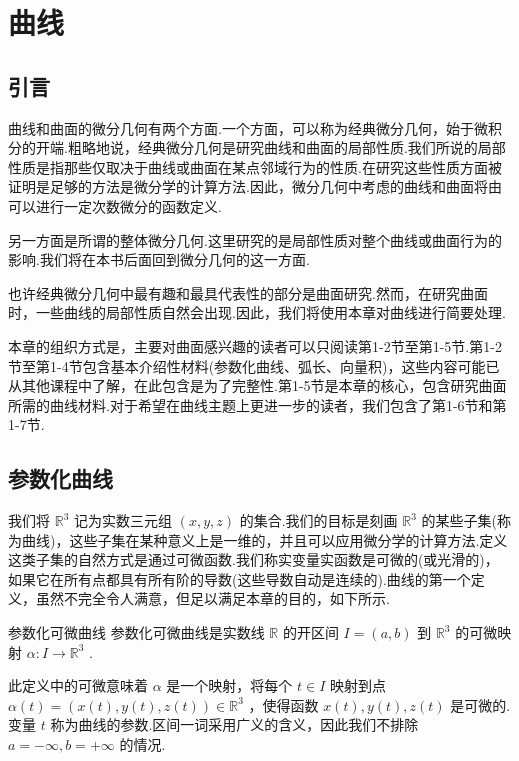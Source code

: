 \chapter{曲线}

\section{引言}

曲线和曲面的微分几何有两个方面.一个方面，可以称为经典微分几何，始于微积分的开端.粗略地说，经典微分几何是研究曲线和曲面的局部性质.我们所说的局部性质是指那些仅取决于曲线或曲面在某点邻域行为的性质.在研究这些性质方面被证明是足够的方法是微分学的计算方法.因此，微分几何中考虑的曲线和曲面将由可以进行一定次数微分的函数定义.

另一方面是所谓的整体微分几何.这里研究的是局部性质对整个曲线或曲面行为的影响.我们将在本书后面回到微分几何的这一方面.

也许经典微分几何中最有趣和最具代表性的部分是曲面研究.然而，在研究曲面时，一些曲线的局部性质自然会出现.因此，我们将使用本章对曲线进行简要处理.

本章的组织方式是，主要对曲面感兴趣的读者可以只阅读第1-2节至第1-5节.第1-2节至第1-4节包含基本介绍性材料(参数化曲线、弧长、向量积)，这些内容可能已从其他课程中了解，在此包含是为了完整性.第1-5节是本章的核心，包含研究曲面所需的曲线材料.对于希望在曲线主题上更进一步的读者，我们包含了第1-6节和第1-7节.

\section{参数化曲线}

我们将 $\mathbb{R}^3$ 记为实数三元组 $(x,y,z)$ 的集合.我们的目标是刻画 $\mathbb{R}^3$ 的某些子集(称为曲线)，这些子集在某种意义上是一维的，并且可以应用微分学的计算方法.定义这类子集的自然方式是通过可微函数.我们称实变量实函数是可微的(或光滑的)，如果它在所有点都具有所有阶的导数(这些导数自动是连续的).曲线的第一个定义，虽然不完全令人满意，但足以满足本章的目的，如下所示.

\begin{definition}{参数化可微曲线}
    参数化可微曲线是实数线 $\mathbb{R}$ 的开区间 $I = (a,b)$ 到 $\mathbb{R}^3$ 的可微映射 $\alpha  : I \rightarrow  \mathbb{R}^3$ .
\end{definition}


此定义中的可微意味着 $\alpha$ 是一个映射，将每个 $t \in  I$ 映射到点 $\alpha(t)  = (x(t) ,y(t) ,z(t))  \in  \mathbb{R}^3$ ，使得函数 $x(t) ,y(t) ,z(t)$ 是可微的.变量 $t$ 称为曲线的参数.区间一词采用广义的含义，因此我们不排除 $a =  - \infty ,b =  + \infty$ 的情况.

